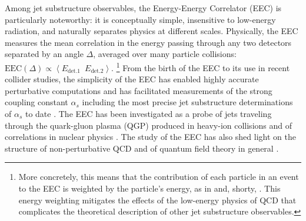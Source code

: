 Among jet substructure observables, the Energy-Energy Correlator (EEC) \cite{Basham:1978bw,Basham:1978zq,Basham:1979gh} is particularly noteworthy:
%
it is conceptually simple, insensitive to low-energy radiation, and naturally separates physics at different scales.
%
Physically, the EEC measures the mean correlation in the energy passing through any two detectors separated by an angle \(\Delta\), averaged over many particle collisions:
%
\(
    \text{EEC}(\Delta)
    \propto
    \left\langle
        E_\text{det.\.1} \,\,\, E_\text{det.\.2}
    \right\rangle
\).%
\footnote{
    More concretely, this means that the contribution of each particle in an event to the EEC is weighted by the particle's energy,
    as in  and, shorty, .
    This energy weighting mitigates the effects of the low-energy physics of QCD that complicates the theoretical description of other jet substructure observables.
}
%
From the birth of the EEC to its use in recent collider studies, the simplicity of the EEC has enabled highly accurate perturbative computations \cite{Clay:1995sd,Glover:1994vz,Kramer:1996qr,DelDuca:2016csb,Gituliar:2017umx,Dixon:2018tpg,Dixon:2018qgp,Henn:2019gkr,Luo:2019nig,Gao:2020vyx,Neill:2022lqx,Lee:2023npz,Kramer:1995qh,deFlorian:2004mp,Banfi:2002vw,Tulipant:2017ybb,Moult:2018jzp,Korchemsky:2019nzm,Dixon:2019uzg,Gao:2019ojf,Luo:2019hmp,Luo:2019bmw,Moult:2019vou,Li:2020bub,Ebert:2020sfi,Li:2021txc,Duhr:2022yyp,Chen:2023zlx,Gao:2023ivm} and has facilitated measurements of the strong coupling constant \(\alpha_s\) \cite{Martin:1986uq,DELPHI:1990sof,SLD:1994yoe,ATLAS:2015yaa,ATLAS:2017qir,dEnterria:2018cye,Kardos:2018kqj,Ali:2020ksn,dEnterria:2022hzv,ATLAS:2023tgo} including the most precise jet substructure determinations of \(\alpha_s\) to date \cite{CMS:2024mlf}.
%
The EEC has been investigated as a probe of jets traveling through the quark-gluon plasma (QGP) produced in heavy-ion collisions \cite{Lokhtin:2004tx,Lokhtin:2006dp,Andres:2022ovj,Barata:2023zqg,Andres:2023xwr,Yang:2023dwc,Barata:2023vnl,Barata:2023bhh,Barata:2024nqo} and of correlations in nuclear physics \cite{Karapetyan:2019fst,Liu:2022wop,Liu:2023aqb,Kang:2023gvg,Cao:2023oef}.
%
The study of the EEC has also shed light on the structure of non-perturbative QCD \cite{Nason:1995np,Korchemsky:1997sy,Korchemsky:1999kt,Dokshitzer:1999sh,Chen:2020vvp,Jaarsma:2023ell,Schindler:2023cww,Lee:2024esz}
and of quantum field theory in general \cite{Richards:1983sr,Sveshnikov:1995vi,Hofman:2008ar,Hatta:2012kn,Belitsky:2013bja,Belitsky:2013ofa,Belitsky:2013xxa,Belitsky:2014zha,Korchemsky:2015ssa,Goncalves:2014ffa,Farnsworth:2015hum,Hofman:2016awc,Kravchuk:2018htv,Kologlu:2019mfz,Chang:2020qpj,Korchemsky:2021htm,Caron-Huot:2022eqs,Chen:2023wah,Chicherin:2023gxt,Chicherin:2024ifn}.
